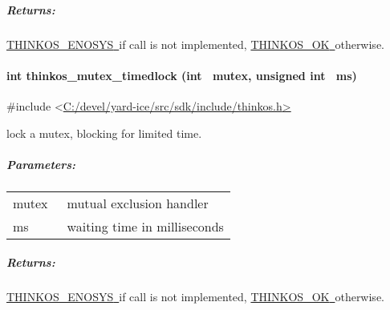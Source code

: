 {\subparagraph{\texorpdfstring{{Returns:}}{Returns:}}\label{returns-14}

{\protect\hyperlink{h.3s49zyc}{THINKOS\_ENOSYS}}{\protect\hyperlink{h.3s49zyc}{~}}{if
call is not implemented,
}{\protect\hyperlink{h.2fk6b3p}{THINKOS\_OK}}{\protect\hyperlink{h.2fk6b3p}{~}}{otherwise.
}

\paragraph{\texorpdfstring{{int thinkos\_mutex\_timedlock (int ~mutex,
unsigned int
~ms)}}{int thinkos\_mutex\_timedlock (int ~mutex, unsigned int ~ms)}}\label{int-thinkos_mutex_timedlock-int-mutex-unsigned-int-ms}

{}

{\#include
\textless{}}{\protect\hyperlink{h.pkwqa1}{C:/devel/yard-ice/src/sdk/include/thinkos.h}}{\protect\hyperlink{h.pkwqa1}{\textgreater{}}}

{lock a mutex, blocking for limited time. }

{}

\subparagraph{\texorpdfstring{{Parameters:}}{Parameters:}}\label{parameters-12}

\protect\hypertarget{t.de941ac38142c0150a822438d9a2a2aec068d18f}{}{}\protect\hypertarget{t.12}{}{}

\begin{longtable}[]{@{}ll@{}}
\toprule
\begin{minipage}[t]{0.47\columnwidth}\raggedright\strut
{mutex}{~}\strut
\end{minipage} & \begin{minipage}[t]{0.47\columnwidth}\raggedright\strut
{mutual exclusion handler }\strut
\end{minipage}\tabularnewline
\begin{minipage}[t]{0.47\columnwidth}\raggedright\strut
{ms}{~}\strut
\end{minipage} & \begin{minipage}[t]{0.47\columnwidth}\raggedright\strut
{waiting time in milliseconds }\strut
\end{minipage}\tabularnewline
\bottomrule
\end{longtable}

\subparagraph{\texorpdfstring{{Returns:}}{Returns:}}\label{returns-15}

{\protect\hyperlink{h.3s49zyc}{THINKOS\_ENOSYS}}{\protect\hyperlink{h.3s49zyc}{~}}{if
call is not implemented,
}{\protect\hyperlink{h.2fk6b3p}{THINKOS\_OK}}{\protect\hyperlink{h.2fk6b3p}{~}}{otherwise.
}

}
